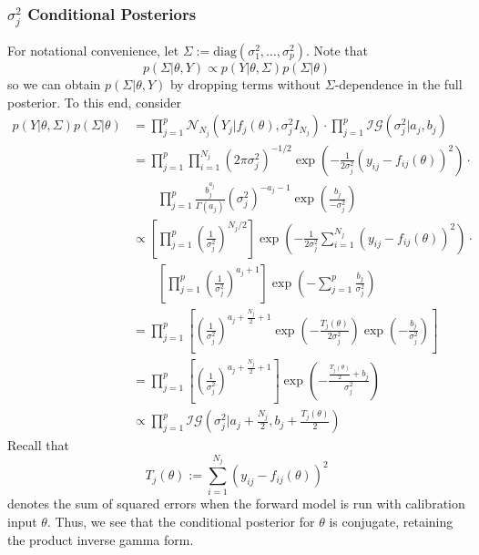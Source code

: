 \documentclass[12pt]{article}
\begin{document}
\subsubsection{$\sigma_j^2$ Conditional Posteriors}
For notational convenience, let $\Sigma := \text{diag}\left(\sigma_1^2, \dots, \sigma_p^2 \right)$. Note that 
\[p(\Sigma|\theta, Y) \propto p(Y|\theta, \Sigma)p(\Sigma|\theta)\]
so we can obtain $p(\Sigma|\theta, Y)$ by dropping terms without $\Sigma$-dependence in the full posterior. To this end, consider 
\begin{align*}
p(Y|\theta, \Sigma)p(\Sigma|\theta) &= \prod_{j = 1}^{p} \mathcal{N}_{N_j}(Y_j|f_j(\theta), \sigma_j^2 I_{N_j}) \cdot \prod_{j = 1}^{p} \mathcal{IG}(\sigma_j^2|a_j, b_j) \\
						      &= \prod_{j = 1}^{p} \prod_{i = 1}^{N_j} \left(2\pi \sigma_j^2\right)^{-1/2} \exp\left(-\frac{1}{2\sigma_j^2}(y_{ij} - f_{ij}(\theta))^2 \right) \cdot \\
						      &\qquad \prod_{j = 1}^{p} \frac{b_j^{a_j}}{\Gamma(a_j)} \left(\sigma_j^2\right)^{-a_j - 1} \exp\left(\frac{b_j}{-\sigma_j^2}\right) \\
						      &\propto \left[\prod_{j = 1}^{p} \left(\frac{1}{\sigma_j^2}\right)^{N_j/2}\right] \exp\left(-\frac{1}{2\sigma_j^2} \sum_{i = 1}^{N_j} (y_{ij} - f_{ij}(\theta))^2 \right) \cdot \\
						      &\qquad \left[\prod_{j = 1}^{p} \left(\frac{1}{\sigma_j^2}\right)^{a_j + 1} \right] \exp\left(-\sum_{j = 1}^{p} \frac{b_j}{\sigma_j^2} \right) \\
						      &=\prod_{j = 1}^{p} \left[\left(\frac{1}{\sigma_j^2}\right)^{a_j + \frac{N_j}{2} + 1} \exp\left(-\frac{T_j(\theta)}{2\sigma_j^2}\right) \exp\left(-\frac{b_j}{\sigma_j^2}\right)\right] \\
						      &= \prod_{j = 1}^{p} \left[\left(\frac{1}{\sigma_j^2}\right)^{a_j + \frac{N_j}{2} + 1} \right]\exp\left(-\frac{\frac{T_j(\theta)}{2} + b_j}{\sigma_j^2} \right) \\
						      &\propto \prod_{j = 1}^{p} \mathcal{IG}\left(\sigma_j^2\bigg|a_j + \frac{N_j}{2}, b_j + \frac{T_j(\theta)}{2} \right)
\end{align*}
Recall that 
\[T_j(\theta) := \sum_{i = 1}^{N_j} (y_{ij} - f_{ij}(\theta))^2\]
denotes the sum of squared errors when the forward model is run with calibration input $\theta$. Thus, we see that the conditional posterior for $\theta$ is conjugate, retaining the product inverse gamma form. 
\end{document}
